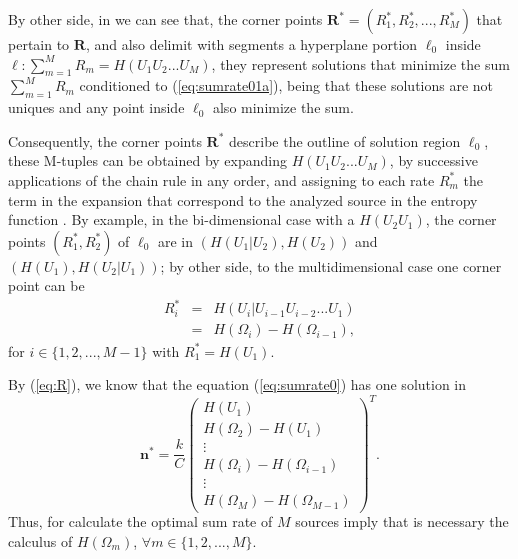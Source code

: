 \documentclass[journal]{IEEEtran}
\begin{document}
By other side, in \cite{cornersuperfluo,cornerqualquer,cornerpesos} 
we can see that, the corner points $\mathbf{R^*}=(R^*_1,R^*_2, ..., R^*_M)$ 
that pertain to $\mathbf{R}$, 
and also delimit  with segments a hyperplane portion $\ell_0$  inside
$\ell :\sum_{m=1}^{M}{ R_m}=H(U_1 U_2 ... U_M)$,
they represent solutions that
minimize the sum $\sum_{m=1}^{M}{ R_m }$ conditioned to (\ref{eq:sumrate01a}), 
being that these solutions are not uniques 
and any point inside $\ell_0$ also minimize the sum. 

Consequently, the corner points $\mathbf{R^*}$
describe the outline of solution region $\ell_0$,
these M-tuples can be obtained by expanding $H(U_1 U_2 ... U_M)$,
by successive applications of the chain rule in any order, and assigning to each 
rate $R^*_m$ the term in the expansion that correspond to the 
analyzed source in the entropy function \cite{cornersuperfluo}. By example,
in the bi-dimensional case with a $H(U_2 U_1)$, the corner points $(R^*_1,R^*_2)$ 
of $\ell_0$ are in $(H(U_1|U_2),H(U_2))$ 
and $(H(U_1), H(U_2|U_1))$; by other side, to the multidimensional case one corner point can be
\begin{equation}\label{eq:R}
\begin{matrix}
R^*_i&=&H(U_i|U_{i-1} U_{i-2} ... U_{1})\\
~    &=&H(\Omega_i)-H(\Omega_{i-1}),
\end{matrix}
\end{equation}
for $i \in \{1, 2, ..., M-1\}$ with $R^*_1=H(U_1)$.

By (\ref{eq:R}), we know that the equation (\ref{eq:sumrate0}) has one solution
in
\small
\begin{equation}\label{eq:sumratefinal}
\mathbf{n^*}=\frac{k}{C} \left(
\begin{matrix}
 H(U_1)\\
 H(\Omega_2)-H(U_{1})\\
 \vdots \\
 H(\Omega_i)-H(\Omega_{i-1})\\
 \vdots \\   
 H(\Omega_M)-H(\Omega_{M-1})
\end{matrix}
\right)^T.
\end{equation}
\normalsize
Thus, for calculate the optimal sum rate of $M$ sources imply that is necessary 
the calculus of $H(\Omega_m)$, $\forall m \in \{1, 2, ..., M\}$.
\end{document}
